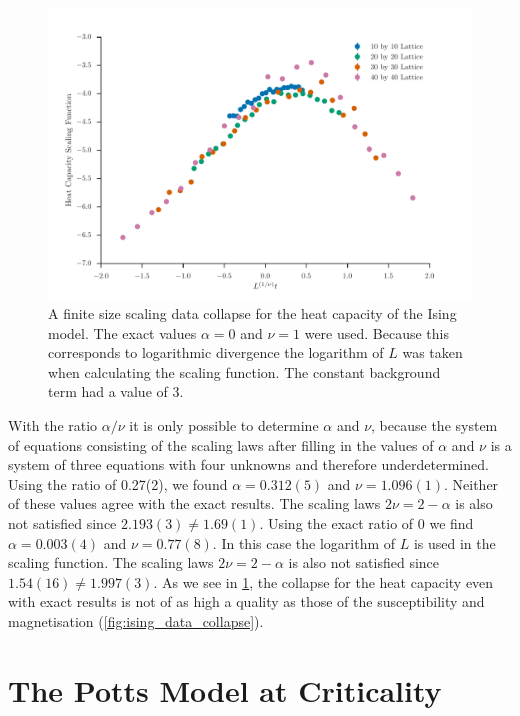 \documentclass[11pt, a4paper]{report} %
\begin{document}
\begin{figure}[htb]
	\includegraphics[width=\linewidth]{ising_heat_capacity_data_collapse.pdf}
	\caption{A finite size scaling data collapse for the heat capacity of the Ising model. The exact values \(\alpha=0\) and \(\nu=1\) were used. Because this corresponds to logarithmic divergence the logarithm of \(L\) was taken when calculating the scaling function. The constant background term had a value of 3.}
	\label{fig:ising_heat_capacity_collapse}
\end{figure}

With the ratio \(\alpha / \nu\) it is only possible to determine \(\alpha\) and \(\nu\), because the system of equations consisting of the scaling laws after filling in the values of \(\alpha\) and \(\nu\) is a system of three equations with four unknowns and therefore underdetermined.
Using the ratio of 0.27(2), we found \(\alpha=0.312(5)\) and \(\nu=1.096(1)\).
Neither of these values agree with the exact results.
The scaling laws \(2\nu = 2-\alpha\) is also not satisfied since \(2.193(3) \neq 1.69(1)\).
Using the exact ratio of 0 we find \(\alpha=0.003(4)\) and \(\nu=0.77(8)\).
In this case the logarithm of \(L\) is used in the scaling function.
The scaling laws \(2\nu = 2-\alpha\) is also not satisfied since \(1.54(16) \neq 1.997(3)\).
As we see in \cref{fig:ising_heat_capacity_collapse}, the collapse for the heat capacity even with exact results is not of as high a quality as those of the susceptibility and magnetisation (\cref{fig:ising_data_collapse}).


\section{The Potts Model at Criticality}
\end{document}

